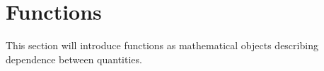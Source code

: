\section{Functions}

This section will introduce functions as mathematical objects describing dependence between quantities.

